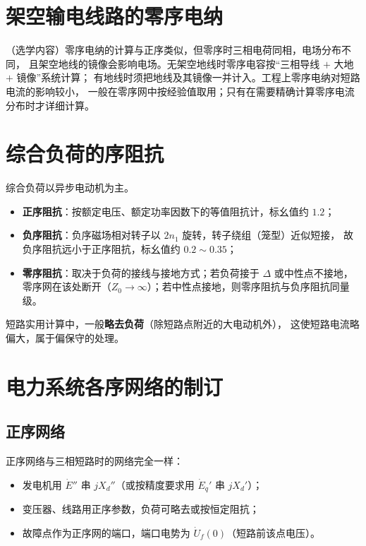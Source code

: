 \section{架空输电线路的零序电纳}

（选学内容）零序电纳的计算与正序类似，但零序时三相电荷同相，电场分布不同，
且架空地线的镜像会影响电场。无架空地线时零序电容按“三相导线 $+$ 大地 $+$ 镜像”系统计算；
有地线时须把地线及其镜像一并计入。工程上零序电纳对短路电流的影响较小，
一般在零序网中按经验值取用；只有在需要精确计算零序电流分布时才详细计算。

\section{综合负荷的序阻抗}

综合负荷以异步电动机为主。
\begin{itemize}
  \item \textbf{正序阻抗}：按额定电压、额定功率因数下的等值阻抗计，标幺值约 $1.2$；
  \item \textbf{负序阻抗}：负序磁场相对转子以 $2n_1$ 旋转，转子绕组（笼型）近似短接，
        故负序阻抗远小于正序阻抗，标幺值约 $0.2\sim0.35$；
  \item \textbf{零序阻抗}：取决于负荷的接线与接地方式；若负荷接于 $\Delta$ 或中性点不接地，
        零序网在该处断开（$Z_0\to\infty$）；若中性点接地，则零序阻抗与负序阻抗同量级。
\end{itemize}
短路实用计算中，一般\textbf{略去负荷}（除短路点附近的大电动机外），
这使短路电流略偏大，属于偏保守的处理。

\section{电力系统各序网络的制订}

\subsection{正序网络}

正序网络与三相短路时的网络完全一样：
\begin{itemize}
  \item 发电机用 $\dot E''$ 串 $jX_d''$（或按精度要求用 $\dot E_q'$ 串 $jX_d'$）；
  \item 变压器、线路用正序参数，负荷可略去或按恒定阻抗；
  \item 故障点作为正序网的端口，端口电势为 $\dot U_f(0)$（短路前该点电压）。
\end{itemize}

